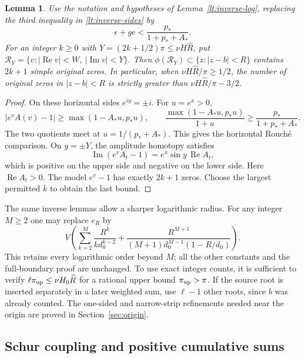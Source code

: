 \documentclass[11pt,reqno]{amsart}
\numberwithin{equation}{section}
\newtheorem{lemma}[theorem]{Lemma}
\theoremstyle{definition}
\theoremstyle{remark}
\renewcommand{\Re}{\operatorname{Re}}
\renewcommand{\Im}{\operatorname{Im}}
\begin{document}
\begin{lemma}\label{lt:quarter-pi}
Use the notation and hypotheses of Lemma~\ref{lt:inverse-log},
replacing the third inequality in \eqref{lt:inverse-sides} by
\[
 \epsilon+ge<\frac{p_*}{1+p_*+A_*}.
\]
For an integer $k\ge0$ with $Y=(2k+1/2)\pi\le\nu H\widehat R$,
put $\mathcal R_Y=\{v:|\Re v|<W,\ |\Im v|<Y\}$.
Then $\phi(\mathcal R_Y)\subset\{z:|z-b|<R\}$ contains $2k+1$
simple original zeros. In particular, when
$\nu H\widehat R/\pi\ge1/2$, the number of original zeros in
$|z-b|<R$ is strictly greater than
$\nu H\widehat R/\pi-3/2$.
\end{lemma}
\begin{proof}
On these horizontal sides $e^{iy}=\pm i$. For $u=e^x>0$,
\[
 |e^vA(v)-1|\ge\max(1-A_*u,p_*u),\qquad
 \frac{\max(1-A_*u,p_*u)}{1+u}\ge\frac{p_*}{1+p_*+A_*}.
\]
The two quotients meet at $u=1/(p_*+A_*)$. This gives the
horizontal Rouch\'e comparison. On $y=\pm Y$, the amplitude homotopy
satisfies
\[
 \Im(e^vA_t-1)=e^x\sin y\,\Re A_t,
\]
which is positive on the upper side and negative on the lower side.
Here $\Re A_t>0$.
The model $e^v-1$ has exactly
$2k+1$ zeros. Choose the largest permitted $k$ to obtain the
last bound.
\end{proof}

The same inverse lemmas allow a sharper logarithmic radius. For any
integer $M\ge2$ one may replace $e_R$ by
\begin{equation}\label{lt:higher-log-loss}
 V\left(\sum_{k=2}^M\frac{R^k}{k d_0^{k-2}}
       +\frac{R^{M+1}}{(M+1)d_0^{M-1}(1-R/d_0)}\right).
\end{equation}
This retains every logarithmic order beyond $M$; all the other
constants and the full-boundary proof are unchanged. To use exact
integer counts, it is sufficient to verify
$\ell\pi_{\rm up}\le\nu H_0\widehat R$ for a rational upper
bound $\pi_{\rm up}>\pi$. If the source root is inserted separately
in a later weighted sum, use $\ell-1$ other roots, since $b$ was
already counted. The one-sided and narrow-strip refinements needed
near the origin are proved in Section~\ref{sec:origin}.

\subsection{Schur coupling and positive cumulative sums}
\end{document}
